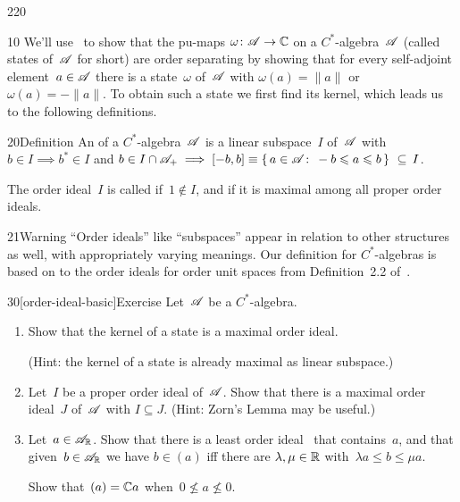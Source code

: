 \begin{parsec}{220}%
\begin{point}{10}%
We'll use~
to show 
that the pu-maps $\omega\colon \mathscr{A}\to\mathbb{C}$
on a $C^*$-algebra~$\mathscr{A}$
(called states
of~$\mathscr{A}$ for short)
are order separating
by showing that
for every self-adjoint element~$a\in \mathscr{A}$
there is a state~$\omega$ of~$\mathscr{A}$ with $\omega(a)=\|a\|$ or 
$\omega(a)=-\|a\|$.
To obtain such a state
we first find its kernel,
which leads us to the following definitions.
\end{point}
\begin{point}{20}{Definition}%
An %
of a $C^*$-algebra~$\mathscr{A}$
is a linear subspace~$I$ of~$\mathscr{A}$
with $b\in I\implies b^*\in I$
and $b\in I\cap\mathscr{A}_{+}\implies [-b,b]
    \equiv \{\,a\in\mathscr{A}\colon \,-b\leqslant a\leqslant b\, \} \ \subseteq\, I$.

The order ideal~$I$ is called %
if~$1\notin I$,
and  
if it is maximal among all proper order ideals.
\begin{point}{21}{Warning}%
``Order ideals'' like ``subspaces'' appear in relation
to other structures as well,
with appropriately varying meanings.
Our definition for $C^*$-algebras is based on
to the order ideals for order unit spaces
from Definition~2.2 of~\cite{kadison1951}.
\end{point}
\end{point}
\begin{point}{30}[order-ideal-basic]{Exercise}%
Let~$\mathscr{A}$ be a $C^*$-algebra.
\begin{enumerate}
\item
Show that the kernel of a state is a maximal order ideal.

(Hint: the kernel of a state is already maximal as linear subspace.)
\item
Let~$I$ be a proper order ideal of~$\mathscr{A}$.
Show that there is a maximal 
order ideal~$J$ of~$\mathscr{A}$ with $I\subseteq J$.
(Hint: Zorn's Lemma may be useful.)
\item
Let~$a\in \mathscr{A}_{\mathbb{R}}$.
Show that there is a least order ideal~%
that contains~$a$,
and that given~$b\in\mathscr{A}_{\mathbb{R}}$
we have $b\in (a)$
iff there are $\lambda,\mu\in \mathbb{R}$
with~$\lambda a\leq b\leq \mu a$.

Show that~$(a)=\mathbb{C} a$
when~$0\nleq a\nleq 0$.


\end{enumerate}
\end{point}
\end{parsec}
